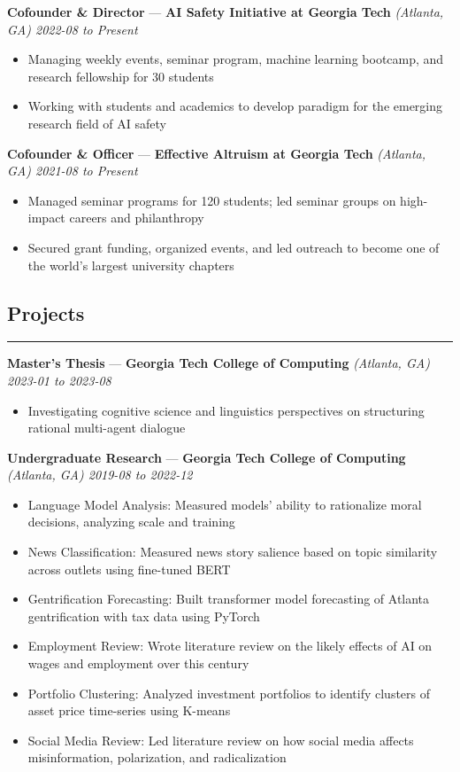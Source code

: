 \documentclass[10pt]{article}
\newcommand{\resumeHeading}[1]{
    \subsection*{#1}
    \hrule
    \vspace*{5pt}
}
\newcommand{\resumeSubHeading}[5]{
    \vspace*{5pt}
    \textbf{#1} — \textbf{#2} \textsl{(#3) \hfill #4 to #5}
}
\begin{document}
\resumeSubHeading
    {Cofounder \& Director}
    {AI Safety Initiative at Georgia Tech}
    {Atlanta, GA}
    {2022-08}
    {Present}
    \begin{itemize}
        \item Managing weekly events, seminar program, machine learning bootcamp, and research fellowship for 30 students
        \item Working with students and academics to develop paradigm for the emerging research field of AI safety
\end{itemize}

\resumeSubHeading
    {Cofounder \& Officer}
    {Effective Altruism at Georgia Tech}
    {Atlanta, GA}
    {2021-08}
    {Present}
\begin{itemize}
    \item Managed seminar programs for 120 students; led seminar groups on high-impact careers and philanthropy
    \item Secured grant funding, organized events, and led outreach to become one of the world's largest university chapters
\end{itemize}



\resumeHeading{Projects \vspace{-2.5pt}}

\resumeSubHeading
    {Master's Thesis}
    {Georgia Tech College of Computing}
    {Atlanta, GA}
    {2023-01}
    {2023-08}
\begin{itemize}
    \item Investigating cognitive science and linguistics perspectives on structuring rational multi-agent dialogue
\end{itemize}

\resumeSubHeading
    {Undergraduate Research}
    {Georgia Tech College of Computing}
    {Atlanta, GA}
    {2019-08}
    {2022-12}
\begin{itemize}
    \item Language Model Analysis:
        Measured models' ability to rationalize moral decisions, analyzing scale and training
    \item News Classification:
        Measured news story salience based on topic similarity across outlets using fine-tuned BERT
    \item Gentrification Forecasting:
        Built transformer model forecasting of Atlanta gentrification with tax data using PyTorch
    \item Employment Review:
        Wrote literature review on the likely effects of AI on wages and employment over this century
    \item Portfolio Clustering:
        Analyzed investment portfolios to identify clusters of asset price time-series using K-means
    \item Social Media Review:
        Led literature review on how social media affects misinformation, polarization, and radicalization
\end{itemize}
\end{document}
